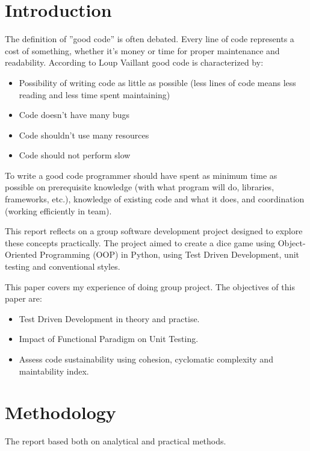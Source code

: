 \documentclass{article}
\begin{document}
\newpage


\section{Introduction}
\label{Introduction}



The definition of ”good code” is often debated. Every line of code represents a cost of something, whether it's money or time for proper maintenance and readability. According to Loup Vaillant \cite{vaillant_2015_what} good code is characterized by:
\begin{itemize}
    \item Possibility of writing code as little as possible (less lines of code means less reading and less time spent maintaining)
    \item Code doesn't have many bugs
    \item Code shouldn't use many resources
    \item Code should not perform slow
\end{itemize}

To write a good code programmer should have spent as minimum time as possible on prerequisite knowledge (with what program will do, libraries, frameworks, etc.), knowledge of existing code and what it does, and coordination (working efficiently in team).

This report reflects on a group software development project designed to explore these concepts practically. The project aimed to create a dice game using Object-Oriented Programming (OOP) in Python, using Test Driven Development, unit testing and conventional styles.

This paper covers my experience of doing group project. 
The objectives of this paper are:
\begin{itemize}
    \item Test Driven Development in theory and practise.
    \item Impact of Functional Paradigm on Unit Testing.
    \item Assess code sustainability using cohesion, cyclomatic complexity and maintability index.
\end{itemize}

\section{Methodology}
The report based both on analytical and practical methods.
\end{document}
